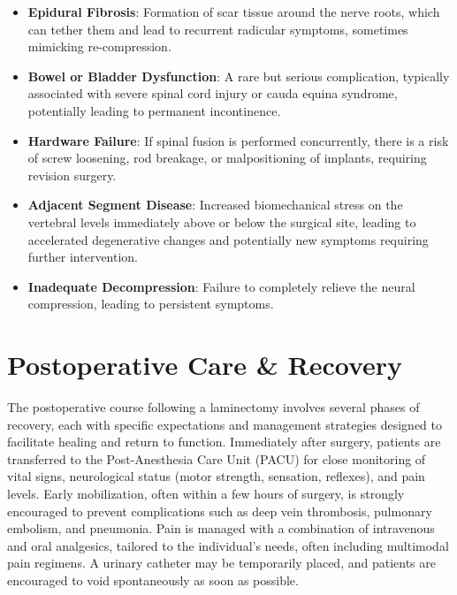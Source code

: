 \begin{itemize}
\begin{itemize}
      \item \textbf{Epidural Fibrosis}: Formation of scar tissue around the nerve roots, which can tether them and lead to recurrent radicular symptoms, sometimes mimicking re-compression.
      \item \textbf{Bowel or Bladder Dysfunction}: A rare but serious complication, typically associated with severe spinal cord injury or cauda equina syndrome, potentially leading to permanent incontinence.
      \item \textbf{Hardware Failure}: If spinal fusion is performed concurrently, there is a risk of screw loosening, rod breakage, or malpositioning of implants, requiring revision surgery.
      \item \textbf{Adjacent Segment Disease}: Increased biomechanical stress on the vertebral levels immediately above or below the surgical site, leading to accelerated degenerative changes and potentially new symptoms requiring further intervention.
      \item \textbf{Inadequate Decompression}: Failure to completely relieve the neural compression, leading to persistent symptoms.
    \end{itemize}
\end{itemize}

\section*{Postoperative Care \& Recovery}
The postoperative course following a laminectomy involves several phases of recovery, each with specific expectations and management strategies designed to facilitate healing and return to function. Immediately after surgery, patients are transferred to the Post-Anesthesia Care Unit (PACU) for close monitoring of vital signs, neurological status (motor strength, sensation, reflexes), and pain levels. Early mobilization, often within a few hours of surgery, is strongly encouraged to prevent complications such as deep vein thrombosis, pulmonary embolism, and pneumonia. Pain is managed with a combination of intravenous and oral analgesics, tailored to the individual's needs, often including multimodal pain regimens. A urinary catheter may be temporarily placed, and patients are encouraged to void spontaneously as soon as possible.

